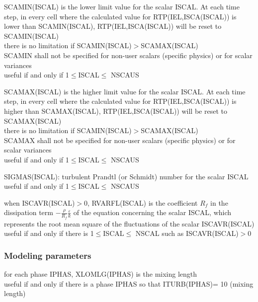 {SCAMIN(ISCAL) is the lower limit value for the scalar ISCAL. At each time step,
in every cell where the calculated value for RTP(IEL,ISCA(ISCAL)) is lower than
\mbox{SCAMIN(ISCAL)}, RTP(IEL,ISCA(ISCAL)) will be reset to
\mbox{SCAMIN(ISCAL)}\\
there is no limitation if SCAMIN(ISCAL)$>$SCAMAX(ISCAL)\\
SCAMIN shall not be specified for non-user scalars (specific physics) or for
scalar variances\\
useful if and only if 1$\leqslant$ISCAL$\leqslant$ NSCAUS}

{SCAMAX(ISCAL) is the higher limit value for the scalar ISCAL. At each time step,
in every cell where the calculated value for RTP(IEL,ISCA(ISCAL)) is higher than
\mbox{SCAMAX(ISCAL)}, RTP(IEL,ISCA(ISCAL)) will be reset to
\mbox{SCAMAX(ISCAL)}\\
there is no limitation if SCAMIN(ISCAL)$>$SCAMAX(ISCAL)\\
SCAMAX shall not be specified for non-user scalars (specific physics) or for
scalar variances\\
useful if and only if 1$\leqslant$ISCAL$\leqslant$ NSCAUS}

{SIGMAS(ISCAL): turbulent Prandtl (or Schmidt) number for the scalar ISCAL\\
useful if and only if  1$\leqslant$ISCAL$\leqslant$ NSCAUS}

{when ISCAVR(ISCAL)$>$0, RVARFL(ISCAL) is the coefficient $R_f$ in the
dissipation term $\displaystyle -\frac{\rho}{R_f}\frac{\varepsilon}{k}$
of the equation concerning the scalar ISCAL,
which represents the root mean square of the
fluctuations of the scalar ISCAVR(ISCAL)\\
useful if and only if there is 1$\leqslant$ISCAL$\leqslant$ NSCAL such as
 ISCAVR(ISCAL)$>$0} 


\subsubsection{Modeling parameters}

{for each phase IPHAS, XLOMLG(IPHAS) is the mixing length\\
useful if and only if there is a phase IPHAS so that ITURB(IPHAS)= 10 
(mixing length)}

